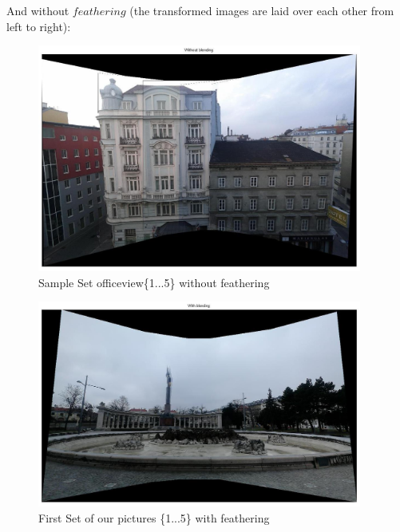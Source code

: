 \documentclass[subfigure,epsfig,fleqn,float,numbers=noenddot]{scrartcl}
\begin{document}
And without $feathering$ (the transformed images are laid over each other from left to right):
\begin{figure}[H]
		\centering
		\includegraphics[width=0.95\textwidth]{./img/withoutBlending2.jpg}
		\caption{Sample Set officeview\{1...5\} without feathering}
		\label{img:withoutBlend2}
\end{figure}

\begin{figure}[H]
		\centering
		\includegraphics[width=0.95\textwidth]{./img/soldier.jpg}
		\caption{First Set of our pictures \{1...5\} with feathering}
		\label{img:own1}
\end{figure}
\end{document}
